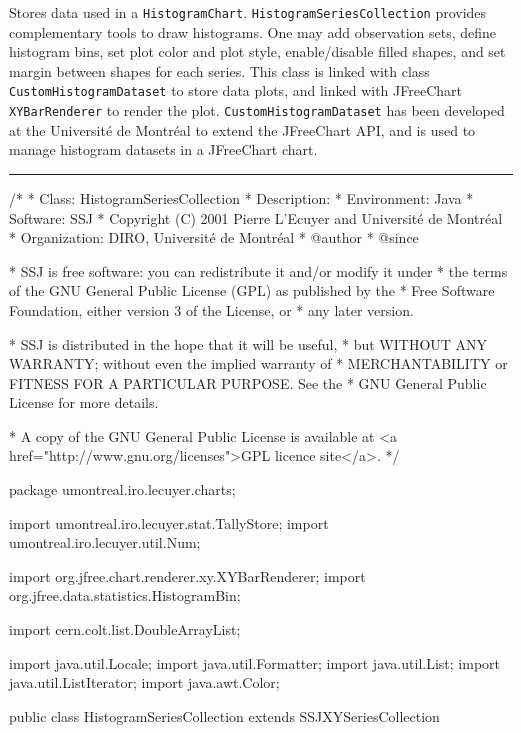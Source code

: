 
Stores data used in a \texttt{HistogramChart}. %
\texttt{HistogramSeriesCollection} provides complementary tools to draw histograms.
One may add observation sets, define histogram bins, set plot color and plot style,
enable/disable filled shapes, and set margin between shapes for each series.
%
This class is linked with class \texttt{CustomHistogramDataset} to store data plots,
and linked with JFreeChart \texttt{XYBarRenderer} to render the plot.
\texttt{CustomHistogramDataset} has been developed at the Universit\'
e de Montr\'eal to extend the JFreeChart API,
and is used to manage histogram datasets in a JFreeChart chart.

\bigskip\hrule
\begin{code}
\begin{hide}
/*
 * Class:        HistogramSeriesCollection
 * Description:  
 * Environment:  Java
 * Software:     SSJ 
 * Copyright (C) 2001  Pierre L'Ecuyer and Université de Montréal
 * Organization: DIRO, Université de Montréal
 * @author       
 * @since

 * SSJ is free software: you can redistribute it and/or modify it under
 * the terms of the GNU General Public License (GPL) as published by the
 * Free Software Foundation, either version 3 of the License, or
 * any later version.

 * SSJ is distributed in the hope that it will be useful,
 * but WITHOUT ANY WARRANTY; without even the implied warranty of
 * MERCHANTABILITY or FITNESS FOR A PARTICULAR PURPOSE.  See the
 * GNU General Public License for more details.

 * A copy of the GNU General Public License is available at
   <a href="http://www.gnu.org/licenses">GPL licence site</a>.
 */
\end{hide}
package umontreal.iro.lecuyer.charts;\begin{hide}

import   umontreal.iro.lecuyer.stat.TallyStore;
import   umontreal.iro.lecuyer.util.Num;

import   org.jfree.chart.renderer.xy.XYBarRenderer;
import   org.jfree.data.statistics.HistogramBin;

import   cern.colt.list.DoubleArrayList;

import   java.util.Locale;
import   java.util.Formatter;
import   java.util.List;
import   java.util.ListIterator;
import   java.awt.Color;\end{hide}

public class HistogramSeriesCollection extends SSJXYSeriesCollection \begin{hide} {
   protected boolean[] filled;   // fill flag for each series
   protected double[] lineWidth; // sets line width
   protected int numBin = 20;    // default number of bins

   private int calcNumBins (int n) {
      // set the number of bins
      int numbins = (int) Math.ceil (1.0 + Num.log2(n));
      if (n > 5000)
         numbins *= 2;
      return numbins;
   }\end{hide}
\end{code}

